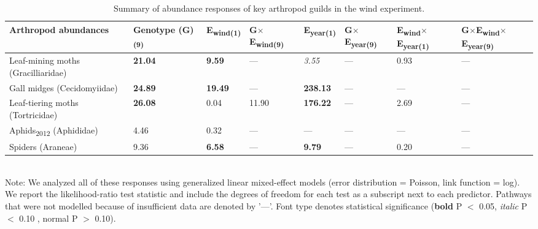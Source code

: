 \documentclass[11pt]{article}
\begin{document}
\begin{table}
\centering
\caption{Summary of abundance responses of key arthropod
guilds in the wind experiment.}
\label{wGuild}
\begin{tabular}{@{}llllllll@{}}
\toprule
Arthropod abundances & Genotype (G)\textsubscript{(9)} &
E\textsubscript{wind(1)} & G$\times$E\textsubscript{wind(9)} & E\textsubscript{year(1)} & G$\times$E\textsubscript{year(9)} & E\textsubscript{wind}$\times$E\textsubscript{year(1)} & G$\times$E\textsubscript{wind}$\times$E\textsubscript{year(9)}\tabularnewline
\midrule
Leaf-mining moths (Gracilliaridae) & \textbf{21.04} & \textbf{9.59} & ---
& \textit{3.55} & --- & 0.93 & ---\tabularnewline
Gall midges (Cecidomyiidae) & \textbf{24.89} & \textbf{19.49} & --- &
\textbf{238.13} & --- & --- & ---\tabularnewline
Leaf-tiering moths (Tortricidae) & \textbf{26.08} & 0.04 & 11.90 &
\textbf{176.22} & --- & 2.69 & ---\tabularnewline
Aphids\textsubscript{2012} (Aphididae) & 4.46 & 0.32 & --- & --- & --- & --- & ---\tabularnewline
Spiders (Araneae) & 9.36 & \textbf{6.58} & --- & \textbf{9.79} & --- & 0.20 & ---\tabularnewline
\bottomrule
\end{tabular}
\bigskip{} 
\\
{\footnotesize Note: We analyzed all of these responses
using generalized linear mixed-effect models (error distribution = Poisson, link function = log). We report the likelihood-ratio test statistic and include the degrees of freedom for each test as a subscript next to each predictor. Pathways that were not modelled because of insufficient data are denoted by '---'. Font type denotes statistical significance (\textbf{bold} P $<$ 0.05, \textit{italic} P $<$ 0.10 , normal P $>$ 0.10).}
\end{table}
\end{document}
